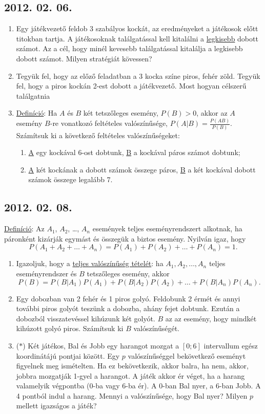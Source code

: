 \documentclass{article}
\newenvironment{abc}{\begin{enumerate}[label=\textit{\alph*})]}{\end{enumerate}}
\begin{document}
\subsection*{2012. 02. 06.}
\begin{enumerate}
\item
Egy játékvezető feldob 3 szabályos kockát, az eredményeket a játékosok előtt titokban tartja. A játékosoknak találgatással kell kitalálni a \underline{legkisebb} dobott számot. Az a cél, hogy minél kevesebb találgatással kitalálja a legkisebb dobott számot. Milyen stratégiát kövessen?
\item
Tegyük fel, hogy az előző feladatban a 3 kocka színe piros, fehér zöld. Tegyük fel, hogy a piros kockán 2-est dobott a játékvezető. Most hogyan célszerű találgatnia
\item \underline{Definíció}: Ha $A$ és $B$ két tetszőleges esemény, $P(B)>0$, akkor az $A$ esemény $B$-re vonatkozó feltételes valószínűsége, $P(A|B)=\frac{P(AB)}{P(B)}$.\\
Számítsuk ki a következő feltételes valószínűségeket:
\begin{abc}
\item \underline{A} egy kockával 6-ost dobtunk, \underline{B} a kockával páros számot dobtunk;
\item \underline{A} két kockának a dobott számok összege páros, \underline{B} a két kockával dobott számok összege legalább 7.
\end{abc}
\end{enumerate}

\subsection*{2012. 02. 08.}
\underline{Definíció}: Az $A_{1}$, $A_{2}$, \ldots, $A_{n}$ események  teljes eseményrendszert alkotnak, ha páronként kizárják egymást és összegük a biztos esemény. Nyilván igaz, hogy
$$P(A_{1}+A_{2}+\ldots+A_{n})=P(A_{1})+P(A_{2})+\ldots+P(A_{n}) =1.$$
\begin{enumerate}
\item 
Igazoljuk, hogy a \underline{teljes valószínűség tételét}: ha 
$A_1, A_2, \ldots, A_n$ teljes eseményrendszer és $B$ tetszőleges esemény, akkor
$$P(B)=P(B|A_{1})P(A_{1})+P(B|A_{2})P(A_{2})+\ldots+P(B|A_{n})P(A_{n}).$$
\item Egy dobozban van 2 fehér és 1 piros golyó. Feldobunk 2 érmét és annyi további piros golyót teszünk a dobozba, ahány fejet dobtunk. Ezután a dobozból visszatevéssel kihúzunk két golyót. $B$ az az esemény, hogy mindkét kihúzott golyó piros. Számítsuk ki $B$ valószínűségét.
\item ($*$)
Két játékos, Bal és Jobb egy harangot mozgat a $[0;6]$ intervallum egész koordinátájú pontjai között. Egy $p$ valószínűséggel bekövetkező eseményt figyelnek meg ismételten. Ha ez bekövetkezik, akkor balra, ha nem, akkor, jobbra mozgatják 1-gyel a harangot. A játék akkor ér véget, ha a harang valamelyik végpontba (0-ba vagy 6-ba ér). A 0-ban Bal nyer, a 6-ban Jobb. A 4 pontból indul a  harang. Mennyi a valószínűsége, hogy Bal nyer? Milyen $p$ mellett igazságos a játék?
\end{enumerate}
\end{document}
